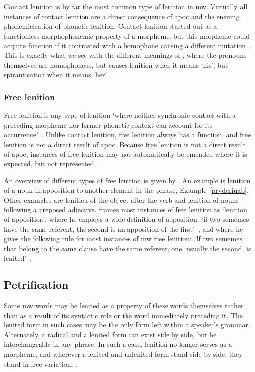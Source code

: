 Contact lenition is by far the most common type of lenition in \gls{mw}. Virtually all instances of contact lenition are a direct consequence of \gls{apoc} and the ensuing phonemicisation of phonetic lenition. Contact lenition started out as a functionless morphophonemic property of a morpheme,  but this morpheme could acquire function if it contrasted with a homophone causing a different mutation~\autocite[1]{schrijver_free_2010}. This is exactly what we see with the different meanings of , where the pronouns themselves are homophonous, but  causes lenition when it means `his', but spirantisation when it means `her'.

\subsubsection{Free lenition}
\label{sec:free-lenition}
Free lenition is any type of lenition `where neither synchronic contact with a preceding morpheme nor former phonetic context can account for its occurrence'~\autocite[1]{schrijver_free_2010}. Unlike contact lenition, free lenition always has a function, and free lenition is not a direct result of \gls{apoc}. Because free lenition is not a direct result of \gls{apoc}, instances of free lenition may not automatically be emended where it is expected, but not represented.

An overview of different types of free lenition is given by \textcite{schrijver_free_2010}. An example is lenition of a noun in apposition to another element in the phrase, \eg Example~\ref{pryderiuab}.
Other examples are lenition of the object after the verb and lenition of nouns following a preposed adjective.
\Textcite{schrijver_free_2010} frames most instances of free lenition  as `lenition of apposition', where he employs a wide definition of apposition: `if two sememes have the same referent, the second is an apposition of the first'~\autocite[3]{schrijver_free_2010}, and where he gives the following rule for most instances of \gls{mw} free lenition: `If two sememes that belong to the same clause have the same referent, one, usually the second, is lenited'~\autocite[3]{schrijver_free_2010}.

\subsection{Petrification}
\label{sec:petrification}
Some \gls{mw} words may be lenited as a property of these words themselves rather than as a result of its syntactic role or the word immediately preceding it.
The lenited form in such cases may be the only form left within a speaker's grammar.
Alternately, a radical and a lenited form can exist side by side, but be interchangeable in any phrase. In such a case, lenition no longer serves as a morpheme, and wherever a lenited and unlenited form stand side by side, they stand in free variation, \eg {}.

